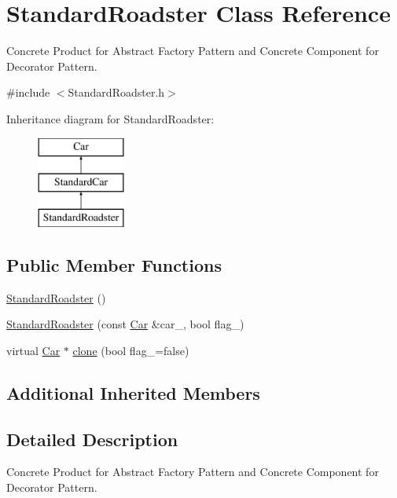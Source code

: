 \hypertarget{class_standard_roadster}{}\section{Standard\+Roadster Class Reference}
\label{class_standard_roadster}


Concrete Product for Abstract Factory Pattern and Concrete Component for Decorator Pattern.  




{\ttfamily \#include $<$Standard\+Roadster.\+h$>$}

Inheritance diagram for Standard\+Roadster\+:\begin{figure}[H]
\begin{center}
\leavevmode
\includegraphics[height=3.000000cm]{class_standard_roadster}
\end{center}
\end{figure}
\subsection*{Public Member Functions}
\begin{DoxyCompactItemize}
\item 
\mbox{\hyperlink{class_standard_roadster_a736b370a7bb115760982e89848c0882f}{Standard\+Roadster}} ()
\item 
\mbox{\hyperlink{class_standard_roadster_a9b39f68839c6a89454d71d9fcd45549c}{Standard\+Roadster}} (const \mbox{\hyperlink{class_car}{Car}} \&car\+\_\+, bool flag\+\_\+)
\item 
virtual \mbox{\hyperlink{class_car}{Car}} $\ast$ \mbox{\hyperlink{class_standard_roadster_aa4aa69bc59c2095faae2fbc7de12798d}{clone}} (bool flag\+\_\+=false)
\end{DoxyCompactItemize}
\subsection*{Additional Inherited Members}


\subsection{Detailed Description}
Concrete Product for Abstract Factory Pattern and Concrete Component for Decorator Pattern. 


